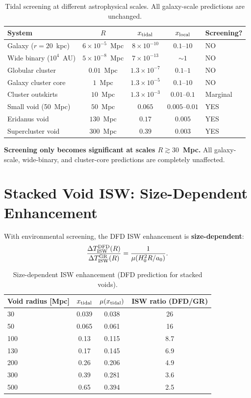 \documentclass[11pt,a4paper]{article}
\newcommand{\ee}[1]{\times 10^{#1}}
\newcommand{\aM}{a_0}
\newcommand{\mufd}{\mu}
\begin{document}
\begin{table}[H]
\centering
\caption{Tidal screening at different astrophysical scales. All
galaxy-scale predictions are unchanged.}
\label{tab:scales}
\begin{tabular}{lcccl}
\toprule
\textbf{System} & $R$ & $x_{\rm tidal}$ & $x_{\rm local}$ &
\textbf{Screening?} \\
\midrule
Galaxy ($r = 20$~kpc) & $6\ee{-5}$~Mpc & $8\ee{-10}$ & $0.1$--$10$ & NO \\
Wide binary ($10^4$~AU) & $5\ee{-8}$~Mpc & $7\ee{-13}$ & $\sim 1$ & NO \\
Globular cluster & $0.01$~Mpc & $1.3\ee{-7}$ & $0.1$--$1$ & NO \\
Galaxy cluster core & $1$~Mpc & $1.3\ee{-5}$ & $0.1$--$10$ & NO \\
Cluster outskirts & $10$~Mpc & $1.3\ee{-3}$ & $0.01$--$0.1$ & Marginal \\
Small void (50~Mpc) & $50$~Mpc & $0.065$ & $0.005$--$0.01$ & YES \\
Eridanus void & $130$~Mpc & $0.17$ & $0.005$ & YES \\
Supercluster void & $300$~Mpc & $0.39$ & $0.003$ & YES \\
\bottomrule
\end{tabular}
\end{table}

\textbf{Screening only becomes significant at scales $R \gtrsim 30$~Mpc.}
All galaxy-scale, wide-binary, and cluster-core predictions are
completely unaffected.


\section{Stacked Void ISW: Size-Dependent Enhancement}
\label{sec:stacked}

With environmental screening, the DFD ISW enhancement is
\textbf{size-dependent}:
\begin{equation}
\frac{\Delta T_{\rm ISW}^{\rm DFD}(R)}{\Delta T_{\rm ISW}^{\rm GR}(R)}
= \frac{1}{\mufd(H_0^2 R/\aM)}.
\end{equation}

\begin{table}[H]
\centering
\caption{Size-dependent ISW enhancement (DFD prediction for stacked voids).}
\label{tab:stacked}
\begin{tabular}{lccc}
\toprule
Void radius [Mpc] & $x_{\rm tidal}$ & $\mufd(x_{\rm tidal})$ &
\textbf{ISW ratio (DFD/GR)} \\
\midrule
30 & 0.039 & 0.038 & 26 \\
50 & 0.065 & 0.061 & 16 \\
100 & 0.13 & 0.115 & 8.7 \\
130 & 0.17 & 0.145 & 6.9 \\
200 & 0.26 & 0.206 & 4.9 \\
300 & 0.39 & 0.281 & 3.6 \\
500 & 0.65 & 0.394 & 2.5 \\
\bottomrule
\end{tabular}
\end{table}
\end{document}

